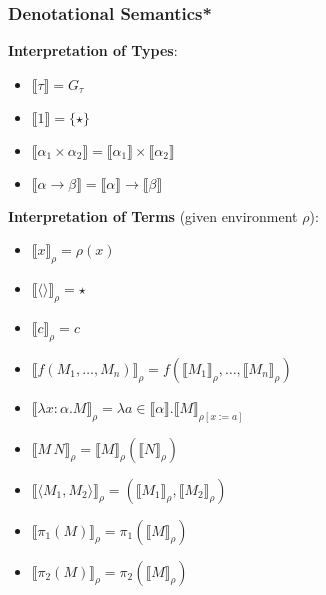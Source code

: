 \documentclass[aspectratio=169]{beamer}
\begin{document}
\begin{frame}
\frametitle{Denotational Semantics*}

\textbf{Interpretation of Types}:

\begin{itemize}
    \item $\llbracket \tau \rrbracket = G_\tau$
    \item $\llbracket 1 \rrbracket = \{\star\}$
    \item $\llbracket \alpha_1 \times \alpha_2 \rrbracket = \llbracket \alpha_1 \rrbracket \times \llbracket \alpha_2 \rrbracket$
    \item $\llbracket \alpha \rightarrow \beta \rrbracket = \llbracket \alpha \rrbracket \rightarrow \llbracket \beta \rrbracket$
\end{itemize}

\textbf{Interpretation of Terms} (given environment $\rho$):
\begin{itemize}
    \item $\llbracket x \rrbracket_\rho = \rho(x)$
    \item $\llbracket \langle \rangle \rrbracket_\rho = \star$
    \item $\llbracket c \rrbracket_\rho = c$
    \item $\llbracket f(M_1, \ldots, M_n) \rrbracket_\rho = f(\llbracket M_1 \rrbracket_\rho, \ldots, \llbracket M_n \rrbracket_\rho)$
    \item $\llbracket \lambda x : \alpha. M \rrbracket_\rho = \lambda a \in \llbracket \alpha \rrbracket. \llbracket M \rrbracket_{\rho[x := a]}$
    \item $\llbracket M \, N \rrbracket_\rho = \llbracket M \rrbracket_\rho (\llbracket N \rrbracket_\rho)$
    \item $\llbracket \langle M_1, M_2 \rangle \rrbracket_\rho = (\llbracket M_1 \rrbracket_\rho, \llbracket M_2 \rrbracket_\rho)$
    \item $\llbracket \pi_1(M) \rrbracket_\rho = \pi_1(\llbracket M \rrbracket_\rho)$
    \item $\llbracket \pi_2(M) \rrbracket_\rho = \pi_2(\llbracket M \rrbracket_\rho)$
\end{itemize}
\end{frame}
\end{document}
